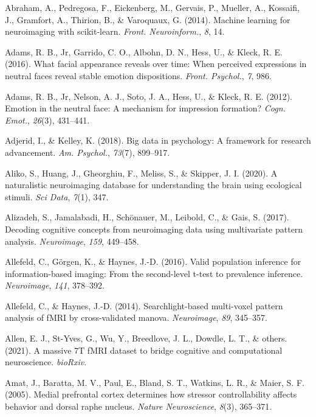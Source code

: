 \documentclass[11pt,american,a4paper,oneside,]{memoir} %
\begin{document}
\leavevmode\hypertarget{ref-Abraham2014-ef}{}%
Abraham, A., Pedregosa, F., Eickenberg, M., Gervais, P., Mueller, A., Kossaifi, J., Gramfort, A., Thirion, B., \& Varoquaux, G. (2014). Machine learning for neuroimaging with scikit-learn. \emph{Front. Neuroinform.}, \emph{8}, 14.

\leavevmode\hypertarget{ref-Adams2016-tz}{}%
Adams, R. B., Jr, Garrido, C. O., Albohn, D. N., Hess, U., \& Kleck, R. E. (2016). What facial appearance reveals over time: When perceived expressions in neutral faces reveal stable emotion dispositions. \emph{Front. Psychol.}, \emph{7}, 986.

\leavevmode\hypertarget{ref-Adams2012-dl}{}%
Adams, R. B., Jr, Nelson, A. J., Soto, J. A., Hess, U., \& Kleck, R. E. (2012). Emotion in the neutral face: A mechanism for impression formation? \emph{Cogn. Emot.}, \emph{26}(3), 431--441.

\leavevmode\hypertarget{ref-Adjerid2018-vs}{}%
Adjerid, I., \& Kelley, K. (2018). Big data in psychology: A framework for research advancement. \emph{Am. Psychol.}, \emph{73}(7), 899--917.

\leavevmode\hypertarget{ref-Aliko2020-ry}{}%
Aliko, S., Huang, J., Gheorghiu, F., Meliss, S., \& Skipper, J. I. (2020). A naturalistic neuroimaging database for understanding the brain using ecological stimuli. \emph{Sci Data}, \emph{7}(1), 347.

\leavevmode\hypertarget{ref-alizadeh2017decoding}{}%
Alizadeh, S., Jamalabadi, H., Schönauer, M., Leibold, C., \& Gais, S. (2017). Decoding cognitive concepts from neuroimaging data using multivariate pattern analysis. \emph{Neuroimage}, \emph{159}, 449--458.

\leavevmode\hypertarget{ref-Allefeld2016-xp}{}%
Allefeld, C., Görgen, K., \& Haynes, J.-D. (2016). Valid population inference for information-based imaging: From the second-level t-test to prevalence inference. \emph{Neuroimage}, \emph{141}, 378--392.

\leavevmode\hypertarget{ref-allefeld2014searchlight}{}%
Allefeld, C., \& Haynes, J.-D. (2014). Searchlight-based multi-voxel pattern analysis of fMRI by cross-validated manova. \emph{Neuroimage}, \emph{89}, 345--357.

\leavevmode\hypertarget{ref-Allen2021-zd}{}%
Allen, E. J., St-Yves, G., Wu, Y., Breedlove, J. L., Dowdle, L. T., \& others. (2021). A massive 7T fMRI dataset to bridge cognitive and computational neuroscience. \emph{bioRxiv}.

\leavevmode\hypertarget{ref-amat2005medial}{}%
Amat, J., Baratta, M. V., Paul, E., Bland, S. T., Watkins, L. R., \& Maier, S. F. (2005). Medial prefrontal cortex determines how stressor controllability affects behavior and dorsal raphe nucleus. \emph{Nature Neuroscience}, \emph{8}(3), 365--371.
\end{document}
